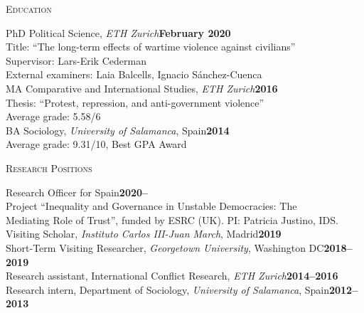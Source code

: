 \documentclass[a4paper, 11pt]{article}
\begin{document}
\vspace{10pt}



\noindent
\begin{minipage}[t]{0.14\textwidth}
  \flushleft
	\textsc{\small Education}
\end{minipage}
\begin{minipage}[t]{0.86\textwidth}
	PhD Political Science, {\it ETH Zurich}\hfill\textbf{February 2020}\\
  \-\hspace{5mm}Title: ``The long-term effects of wartime violence against civilians''\\
  \-\hspace{5mm}Supervisor: Lars-Erik Cederman\\
	\-\hspace{5mm}External examiners: Laia Balcells, Ignacio Sánchez-Cuenca\\
  MA Comparative and International Studies, {\it ETH Zurich}\hfill\textbf{2016}\\
  \-\hspace{5mm}Thesis: ``Protest, repression, and anti-government violence''\\
  \-\hspace{5mm}Average grade: 5.58/6\\
  BA Sociology, {\it University of Salamanca}, Spain\hfill\textbf{2014}\\
  \-\hspace{5mm}Average grade: 9.31/10, Best GPA Award
\end{minipage}

\vspace{20pt}


\noindent
\begin{minipage}[t]{0.14\textwidth}
  \flushleft
  \textsc{\small Research Positions}
\end{minipage}
\begin{minipage}[t]{0.86\textwidth}
  Research Officer for Spain\hfill{\bf 2020--}\\
  \-\hspace{5mm}Project ``Inequality and Governance in Unstable Democracies: The\\
  \-\hspace{5mm}Mediating Role of Trust'', funded by ESRC (UK). PI: Patricia Justino, IDS.\\
  Visiting Scholar, {\it Instituto Carlos III-Juan March}, Madrid\hfill{\bf 2019}\\
  Short-Term Visiting Researcher, {\it Georgetown University}, Washington DC\hfill{\bf 2018--2019}\\
  Research assistant, International Conflict Research, {\it ETH Zurich}\hfill{\bf 2014--2016}\\
  Research intern, Department of Sociology, {\it University of Salamanca}, Spain\hfill{\bf 2012--2013}
\end{minipage}
\end{document}
